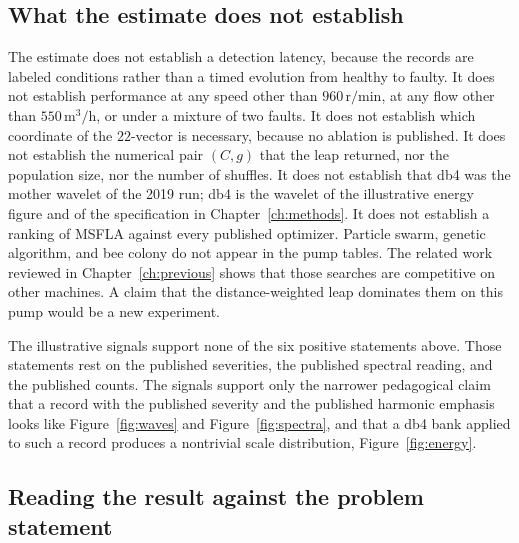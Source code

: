 \subsection{What the estimate does not establish}

The estimate does not establish a detection latency, because the records are labeled conditions rather than a timed evolution from healthy to faulty.
It does not establish performance at any speed other than \(960\,\mathrm{r/min}\), at any flow other than \(550\,\mathrm{m}^{3}/\mathrm{h}\), or under a mixture of two faults.
It does not establish which coordinate of the \(22\)-vector is necessary, because no ablation is published.
It does not establish the numerical pair \((C, g)\) that the leap returned, nor the population size, nor the number of shuffles.
It does not establish that db4 was the mother wavelet of the 2019 run; db4 is the wavelet of the illustrative energy figure and of the specification in Chapter~\ref{ch:methods}.
It does not establish a ranking of MSFLA against every published optimizer.
Particle swarm, genetic algorithm, and bee colony do not appear in the pump tables.
The related work reviewed in Chapter~\ref{ch:previous} shows that those searches are competitive on other machines.
A claim that the distance-weighted leap dominates them on this pump would be a new experiment.

The illustrative signals support none of the six positive statements above.
Those statements rest on the published severities, the published spectral reading, and the published counts.
The signals support only the narrower pedagogical claim that a record with the published severity and the published harmonic emphasis looks like Figure~\ref{fig:waves} and Figure~\ref{fig:spectra}, and that a db4 bank applied to such a record produces a nontrivial scale distribution, Figure~\ref{fig:energy}.

\subsection{Reading the result against the problem statement}

